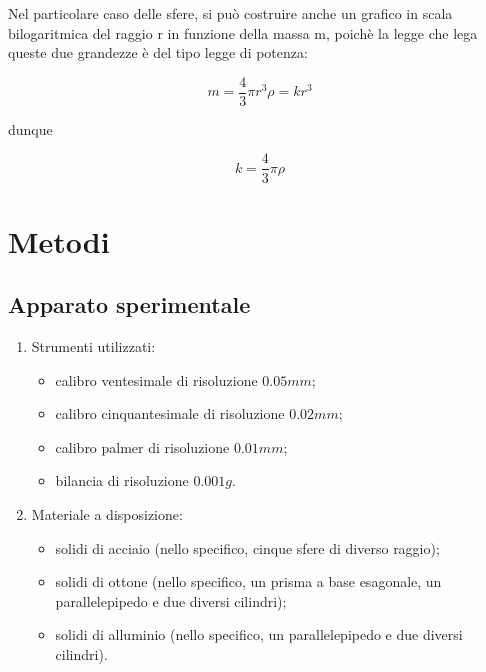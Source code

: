 \documentclass{article}
\begin{document}
Nel particolare caso delle sfere, si può costruire anche un grafico in scala bilogaritmica del raggio r in funzione della massa m, poichè la legge che lega queste due grandezze è del tipo legge di potenza:

\begin{equation}
\label{eq:1}
    m = \frac{4}{3}\pi r^3 \rho = kr^3
\end{equation}

dunque

\begin{equation}
\label{eq:2}
    k = \frac{4}{3} \pi \rho
\end{equation}


\FloatBarrier
 
\section{Metodi} 

\subsection{Apparato sperimentale} %
\label{subsec: metodi}
\begin{enumerate}
    \item Strumenti utilizzati:
    \begin{itemize}
        \item calibro ventesimale di risoluzione $0.05 mm$;
        \item calibro cinquantesimale di risoluzione $0.02 mm$;
        \item calibro palmer di risoluzione $0.01mm$;
        \item bilancia di risoluzione $0.001g$.
    \end{itemize}

    \item Materiale a disposizione:
    \begin{itemize}
        \item solidi di acciaio (nello specifico, cinque sfere di diverso raggio);
        \item solidi di ottone (nello specifico, un prisma a base esagonale, un parallelepipedo e due diversi cilindri);
        \item solidi di alluminio (nello specifico, un parallelepipedo e due diversi cilindri).
    \end{itemize}
\end{enumerate}
\end{document}
